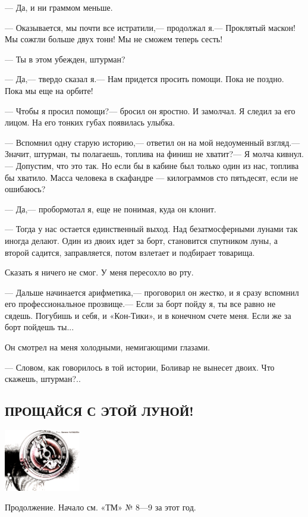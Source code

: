 \documentclass[11pt,a4paper,oneside]{article}
\begin{document}
— Да, и ни граммом меньше.

— Оказывается, мы почти все истратили,— продолжал я.— Проклятый маскон! Мы сожгли больше двух тонн! Мы не сможем теперь сесть!

— Ты в этом убежден, штурман?

— Да,— твердо сказал я.— Нам придется просить помощи. Пока не поздно. Пока мы еще на орбите!

— Чтобы я просил помощи?— бросил он яростно. И замолчал. Я следил за его лицом. На его тонких губах появилась улыбка.

— Вспомнил одну старую историю,— ответил он на мой недоуменный взгляд.— Значит, штурман, ты полагаешь, топлива на финиш не хватит?— Я молча кивнул.— Допустим, что это так. Но если бы в кабине был только один из нас, топлива бы хватило. Масса человека в скафандре — килограммов сто пятьдесят, если не ошибаюсь?

— Да,— пробормотал я, еще не понимая, куда он клонит.

— Тогда у нас остается единственный выход. Над безатмосферными лунами так иногда делают. Один из двоих идет за борт, становится спутником луны, а второй садится, заправляется, потом взлетает и подбирает товарища.

Сказать я ничего не смог. У меня пересохло во рту.

— Дальше начинается арифметика,— проговорил он жестко, и я сразу вспомнил его профессиональное прозвище.— Если за борт пойду я, ты все равно не сядешь. Погубишь и себя, и «Кон-Тики», и в конечном счете меня. Если же за борт пойдешь ты...

Он смотрел на меня холодными, немигающими глазами.

— Словом, как говорилось в той истории, Боливар не вынесет двоих. Что скажешь, штурман?..

\subsection{ПРОЩАЙСЯ С ЭТОЙ ЛУНОЙ!}
\label{goodby_moon}

\includegraphics[width=0.25\textwidth]{start}

Продолжение. Начало см. «ТМ» № 8—9 за этот год.
\end{document}
